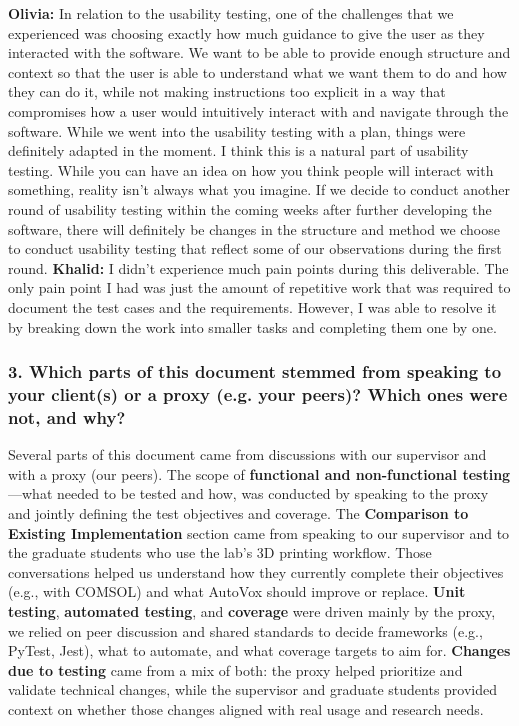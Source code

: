 \documentclass[12pt, titlepage]{article}
\begin{document}
\newline
\textbf{Olivia: } In relation to the usability testing, one of the challenges that we experienced was choosing exactly how much guidance to give the user as they interacted with the software. We want to be able to provide enough structure and context so that the user is able to understand what we want them to do and how they can do it, while not making instructions too explicit in a way that compromises how a user would intuitively interact with and navigate through the software. While we went into the usability testing with a plan, things were definitely adapted in the moment. I think this is a natural part of usability testing. While you can have an idea on how you think people will interact with something, reality isn’t always what you imagine. If we decide to conduct another round of usability testing within the coming weeks after further developing the software, there will definitely be changes in the structure and method we choose to conduct usability testing that reflect some of our observations during the first round.
\newline
\newline
\textbf{Khalid: } I didn't experience much pain points during this deliverable. The only pain point I had was just the amount of repetitive work that was required to document the test cases and the requirements. However, I was able to resolve it by breaking down the work into smaller tasks and completing them one by one.

\subsubsection*{3. Which parts of this document stemmed from speaking to your client(s) or
a proxy (e.g. your peers)? Which ones were not, and why?}
\bigskip
Several parts of this document came from discussions with our supervisor and with a proxy (our peers). The scope of \textbf{functional and non-functional testing}---what needed to be tested and how, was conducted by speaking to the proxy and jointly defining the test objectives and coverage. The \textbf{Comparison to Existing Implementation} section came from speaking to our supervisor and to the graduate students who use the lab's 3D printing workflow. Those conversations helped us understand how they currently complete their objectives (e.g., with COMSOL) and what AutoVox should improve or replace. \textbf{Unit testing}, \textbf{automated testing}, and \textbf{coverage} were driven mainly by the proxy, we relied on peer discussion and shared standards to decide frameworks (e.g., PyTest, Jest), what to automate, and what coverage targets to aim for. \textbf{Changes due to testing} came from a mix of both: the proxy helped prioritize and validate technical changes, while the supervisor and graduate students provided context on whether those changes aligned with real usage and research needs.
\end{document}
